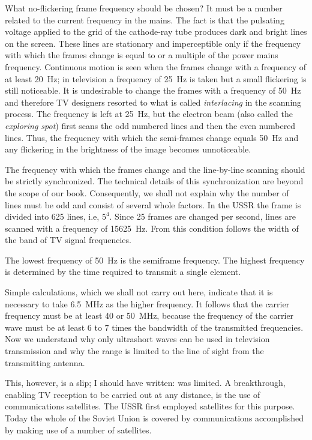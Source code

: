 What no-flickering frame frequency should be chosen? It must be a number related to the current frequency in the mains. The fact is that the pulsating voltage applied to the grid of the cathode-ray tube produces dark and bright lines on the screen. These lines are stationary and imperceptible only if the frequency with which the frames change is equal to or a multiple of the power mains frequency. Continuous motion is seen when the frames change with a frequency of at least \SI{20}{\hertz}; in television a frequency of \SI{25}{\hertz} is taken but a small flickering is still noticeable. It is undesirable to change the frames with a frequency of \SI{50}{\hertz} and therefore TV designers resorted to what is called \emph{interlacing} in the scanning process. The frequency is left at \SI{25}{\hertz}, but the electron beam (also called the \emph{exploring spot}) first scans the odd numbered lines and then the even numbered lines. Thus, the frequency with which the semi-frames change equals \SI{50}{\hertz} and any flickering in the brightness of the image becomes unnoticeable.

The frequency with which the frames change and the line-by-line scanning should be strictly synchronized. The technical details of this synchronization are beyond the scope of our book. Consequently, we shall not explain why the number of lines must be odd and consist of several whole factors. In the USSR the frame is divided into 625 lines, i.e, $5^{4}$. Since 25 frames are changed per second, lines are scanned with a frequency of \SI{15625}{\hertz}. From this condition follows the width of the band of TV signal frequencies.

The lowest frequency of \SI{50}{\hertz} is the semiframe frequency. The highest frequency is determined by the time required to transmit a single element.

Simple calculations, which we shall not carry out here, indicate that it is necessary to take \SI{6.5}{\mega\hertz} as the higher frequency. It follows that the carrier frequency must be at least 40 or \SI{50}{\mega\hertz}, because the frequency of the carrier wave must be at least 6 to 7 times the bandwidth of the transmitted frequencies. Now we understand why only ultrashort waves can be used in television transmission and why the range is limited to the line of sight from the transmitting antenna.

This, however, is a slip; I should have written: was limited. A breakthrough, enabling TV reception to be carried out at any distance, is the use of communications satellites. The USSR first employed satellites for this purpose. Today the whole of the Soviet Union is covered by communications accomplished by making use of a number of satellites.

